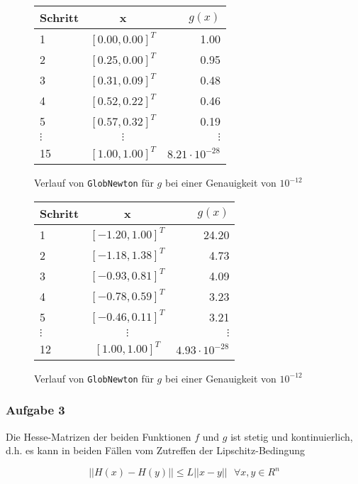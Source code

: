 \documentclass[a4paper, 12pt]{report}
\begin{document}
\begin{figure}[H]
  \centering
  \def\arraystretch{1.25}
  \begin{tabular}{l|c|r}
    \hline
    \textbf{Schritt} & \textbf{x} & \textbf{$g(x)$}\\
    \hline
    1 & $[0.00, 0.00]^T$ & 1.00\\
    2 & $[0.25, 0.00]^T$ & 0.95\\
    3 & $[0.31, 0.09]^T$ & 0.48\\
    4 & $[0.52, 0.22]^T$ & 0.46\\
    5 & $[0.57, 0.32]^T$ & 0.19\\
    $\vdots$ & $\vdots$ & $\vdots$\\
    15 & $[1.00, 1.00]^T$ & $8.21 \cdot 10^{-28}$\\
    \hline
  \end{tabular}
  \caption{Verlauf von \lstinline[basicstyle=\ttfamily\color{black}]|GlobNewton| für $g$ bei einer Genauigkeit von $10^{-12}$}
\end{figure}

\begin{figure}[H]
  \centering
  \def\arraystretch{1.25}
  \begin{tabular}{l|c|r}
    \hline
    \textbf{Schritt} & \textbf{x} & \textbf{$g(x)$}\\
    \hline
    1 & $[-1.20, 1.00]^T$ & 24.20\\
    2 & $[-1.18, 1.38]^T$ & 4.73\\
    3 & $[-0.93, 0.81]^T$ & 4.09\\
    4 & $[-0.78, 0.59]^T$ & 3.23\\
    5 & $[-0.46, 0.11]^T$ & 3.21\\
    $\vdots$ & $\vdots$ & $\vdots$\\
    12 & $[1.00, 1.00]^T$ & $4.93 \cdot 10^{-28}$\\
    \hline
  \end{tabular}
  \caption{Verlauf von \lstinline[basicstyle=\ttfamily\color{black}]|GlobNewton| für $g$ bei einer Genauigkeit von $10^{-12}$}
\end{figure}

\subsubsection{Aufgabe 3}
Die Hesse-Matrizen der beiden Funktionen $f$ und $g$ ist stetig und kontinuierlich, d.h. es kann in beiden Fällen vom
Zutreffen der Lipschitz-Bedingung

$$ ||H(x) - H(y)|| \leq L||x-y|| \text{  } \forall x,y \in R^n$$
\end{document}
